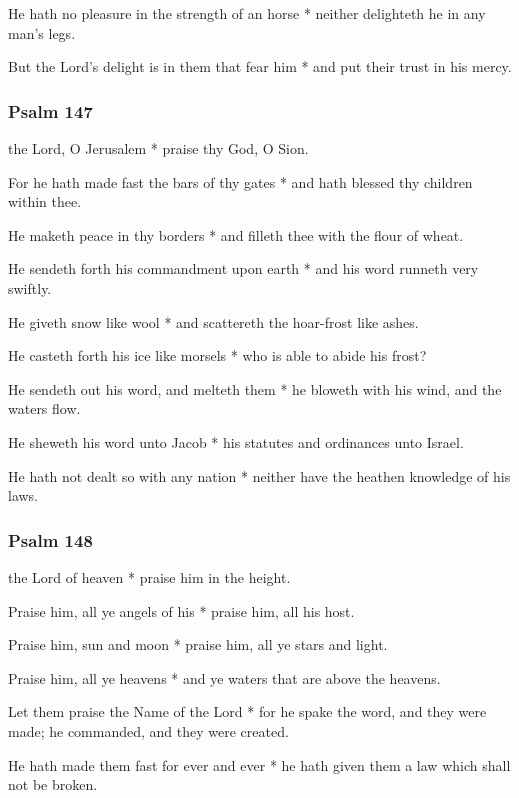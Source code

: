 He hath no pleasure in the strength of an horse * neither delighteth he in any man's legs.

But the Lord's delight is in them that fear him * and put their trust in his mercy.

\subsubsection{Psalm 147}


 the Lord, O Jerusalem * praise thy God, O Sion.

For he hath made fast the bars of thy gates * and hath blessed thy children within thee.

He maketh peace in thy borders * and filleth thee with the flour of wheat.

He sendeth forth his commandment upon earth * and his word runneth very swiftly.

He giveth snow like wool * and scattereth the hoar-frost like ashes.

He casteth forth his ice like morsels * who is able to abide his frost?

He sendeth out his word, and melteth them * he bloweth with his wind, and the waters flow.

He sheweth his word unto Jacob * his statutes and ordinances unto Israel.

He hath not dealt so with any nation * neither have the heathen knowledge of his laws.

\subsubsection{Psalm 148}


 the Lord of heaven * praise him in the height.

Praise him, all ye angels of his * praise him, all his host.

Praise him, sun and moon * praise him, all ye stars and light.

Praise him, all ye heavens * and ye waters that are above the heavens.

Let them praise the Name of the Lord * for he spake the word, and they were made; he commanded, and they were created.

He hath made them fast for ever and ever * he hath given them a law which shall not be broken.

